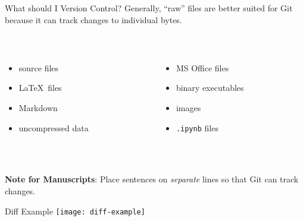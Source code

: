 \documentclass{beamer}
\begin{document}
\begin{frame}{What should I Version Control?}
  Generally, ``raw'' files are better suited for Git because it can track changes to individual bytes.

  \hfill \\

  \begin{columns}
    \begin{column}{0.5\textwidth}
      \begin{itemize}
        \item source files

        \item \LaTeX\ files

        \item Markdown
        
        \item uncompressed data
      \end{itemize}
    \end{column}

    \begin{column}{0.5\textwidth}
      \begin{itemize}
        \item MS Office files

        \item binary executables

        \item images
        
        \item \texttt{.ipynb} files
      \end{itemize}
    \end{column}
  \end{columns}

  \hfill \\
  \hfill \\
  
  \textbf{Note for Manuscripts}: Place sentences on \textit{separate} lines so that Git can track changes.
\end{frame}

\begin{frame}{Diff Example}
  \center
  \texttt{[image: diff-example]}
\end{frame}
\end{document}
